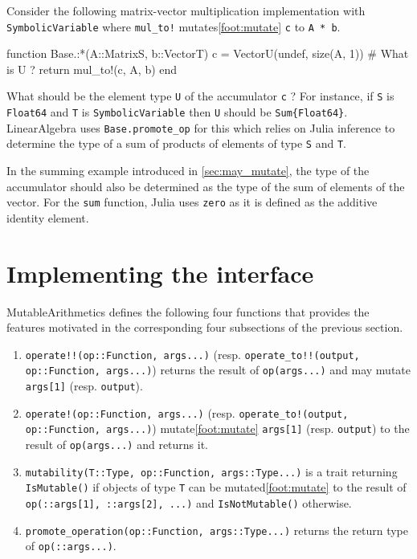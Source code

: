 \documentclass{juliacon}
\newcommand{\ma}{MutableArithmetics}
\begin{document}
Consider the following matrix-vector multiplication implementation with \lstinline|SymbolicVariable|
where \lstinline|mul_to!| mutates\cref{foot:mutate} \lstinline|c| to \lstinline|A * b|.
\begin{jllisting}
function Base.:*(A::Matrix{S}, b::Vector{T})
    c = Vector{U}(undef, size(A, 1)) # What is U ?
    return mul_to!(c, A, b)
end
\end{jllisting}
What should be the element type \lstinline|U| of the accumulator \lstinline|c| ?
For instance, if \lstinline|S| is \lstinline|Float64|
and \lstinline|T| is \lstinline|SymbolicVariable|
then \lstinline|U| should be \lstinline|Sum{Float64}|.
LinearAlgebra uses \lstinline|Base.promote_op| for this which relies on Julia inference
to determine the type of a sum of products of elements of type \lstinline|S| and \lstinline|T|.

In the summing example introduced in \cref{sec:may_mutate},
the type of the accumulator should also be determined as the type of the sum of elements of the vector.
For the \lstinline|sum| function, Julia uses \lstinline|zero| as it is defined as
the additive identity element.

\section{Implementing the interface}
\label{sec:impl}

\ma{} defines the following four functions that provides the features motivated in the corresponding four subsections of the previous section.
\begin{enumerate}
  \item \lstinline|operate!!(op::Function, args...)| (resp. \lstinline|operate_to!!(output, op::Function, args...)|) returns the result of \lstinline|op(args...)| and may mutate \lstinline|args[1]| (resp. \lstinline|output|).
  \item \lstinline|operate!(op::Function, args...)| (resp. \lstinline|operate_to!(output, op::Function, args...)|) mutate\cref{foot:mutate} \lstinline|args[1]| (resp. \lstinline|output|) to the result of \lstinline|op(args...)| and returns it.
  \item \lstinline|mutability(T::Type, op::Function, args::Type...)| is a trait returning \lstinline|IsMutable()| if objects of type \lstinline|T| can be mutated\cref{foot:mutate} to the result of \lstinline|op(::args[1], ::args[2], ...)| and \lstinline|IsNotMutable()| otherwise.
  \item \lstinline|promote_operation(op::Function, args::Type...)| returns the return type of \lstinline|op(::args...)|.
\end{enumerate}
\end{document}
